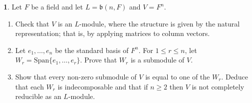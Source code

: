 \documentclass[12pt]{article}
\theoremstyle{definition}
\newtheorem{ex}{}
\begin{document}
\begin{ex}
	Let $F$ be a field and let $L = \mathfrak{b}(n, F)$ and $V = F^n$.
	\begin{enumerate}[label=(\roman*)]
		\item Check that $V$ is an $L$-module, where the structure is given by the natural representation; that is, by applying matrices to column vectors.
		\item Let $e_1, \dots, e_n$ be the standard basis of $F^n$.
		      For $1 \leq r \leq n$, let $W_r = \mathrm{Span}\lbrace e_1, \dots, e_r \rbrace$.
		      Prove that $W_r$ is a submodule of $V$.
		\item Show that every non-zero submodule of $V$ is equal to one of the $W_r$.
		      Deduce that each $W_r$ is indecomposable and that if $n \geq 2$ then $V$ is not completely reducible as an $L$-module.
	\end{enumerate}
\end{ex}
\end{document}
